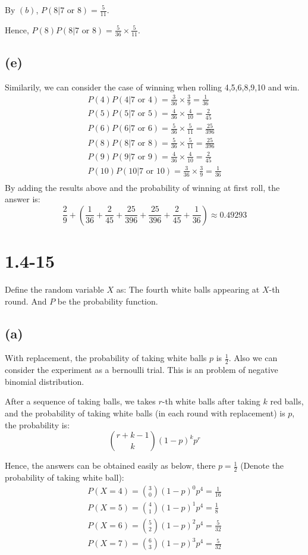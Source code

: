 \documentclass[12pt]{article}
\begin{document}
By $(b)$, $P(8|\text{7 or 8})=\frac{5}{11}$.

Hence, $P(8)P(8|\text{7 or 8})=\frac{5}{36}\times\frac{5}{11}$.
\subsection*{(e)}
Similarily, we can consider the case of winning when rolling 4,5,6,8,9,10 and win.
\begin{align*}
    P(4)P(4|\text{7 or 4})=\frac{3}{36}\times \frac{3}{9}=\frac{1}{36} \\
    P(5)P(5|\text{7 or 5})=\frac{4}{36}\times \frac{4}{10}=\frac{2}{45} \\
    P(6)P(6|\text{7 or 6})=\frac{5}{36}\times \frac{5}{11}=\frac{25}{396} \\
    P(8)P(8|\text{7 or 8})=\frac{5}{36}\times \frac{5}{11}=\frac{25}{396} \\
    P(9)P(9|\text{7 or 9})=\frac{4}{36}\times \frac{4}{10}=\frac{2}{45} \\
    P(10)P(10|\text{7 or 10})=\frac{3}{36}\times \frac{3}{9}=\frac{1}{36} \\
\end{align*}
By adding the results above and the probability of winning at first roll, the answer is:
\[\frac{2}{9}+(\frac{1}{36}+\frac{2}{45}+\frac{25}{396}+\frac{25}{396}+\frac{2}{45}+\frac{1}{36})\approx 0.49293\]
\section*{1.4-15}
Define the random variable $X$ as: The fourth white balls appearing at $X$-th round. And $P$ be the probability function.
\subsection*{(a)}
With replacement, the probability of taking white balls $p$ is $\frac{1}{2}$. Also we can consider the experiment as a bernoulli trial. This is an problem of negative binomial distribution. 

After a sequence of taking balls, we takes $r$-th white balls after taking $k$ red balls, and the probability of taking white balls (in each round with replacement) is $p$, the probability is:
\[\binom{r+k-1}{k}(1-p)^kp^r\]

Hence, the answers can be obtained easily as below, there $p=\frac{1}{2}$ (Denote the probability of taking white ball):
\begin{align*}
    P(X=4)=\binom{3}{0}(1-p)^0p^4=\frac{1}{16} \\
    P(X=5)=\binom{4}{1}(1-p)^1p^4=\frac{1}{8} \\
    P(X=6)=\binom{5}{2}(1-p)^2p^4=\frac{5}{32} \\
    P(X=7)=\binom{6}{3}(1-p)^3p^4=\frac{5}{32}
\end{align*} 
\end{document}
